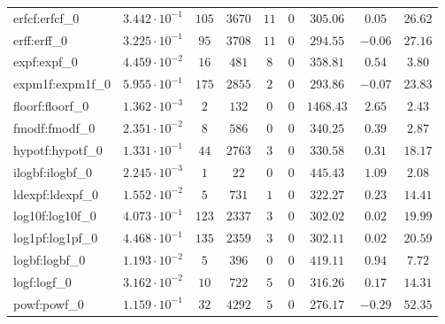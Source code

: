 \begin{tabular}{|l|c|c|c|c|c|c|c|c|}
erfcf:erfcf\_0               & $ 3.442 \cdot 10^{-1} $ & $ 105    $ & $ 3670  $ & $ 11  $ & $ 0   $ & $ 305.06      $ & $ 0.05    $ & $ 26.62   $ \\
erff:erff\_0                 & $ 3.225 \cdot 10^{-1} $ & $ 95     $ & $ 3708  $ & $ 11  $ & $ 0   $ & $ 294.55      $ & $ -0.06   $ & $ 27.16   $ \\
expf:expf\_0                 & $ 4.459 \cdot 10^{-2} $ & $ 16     $ & $ 481   $ & $ 8   $ & $ 0   $ & $ 358.81      $ & $ 0.54    $ & $ 3.80    $ \\
expm1f:expm1f\_0             & $ 5.955 \cdot 10^{-1} $ & $ 175    $ & $ 2855  $ & $ 2   $ & $ 0   $ & $ 293.86      $ & $ -0.07   $ & $ 23.83   $ \\
floorf:floorf\_0             & $ 1.362 \cdot 10^{-3} $ & $ 2      $ & $ 132   $ & $ 0   $ & $ 0   $ & $ 1468.43     $ & $ 2.65    $ & $ 2.43    $ \\
fmodf:fmodf\_0               & $ 2.351 \cdot 10^{-2} $ & $ 8      $ & $ 586   $ & $ 0   $ & $ 0   $ & $ 340.25      $ & $ 0.39    $ & $ 2.87    $ \\
hypotf:hypotf\_0             & $ 1.331 \cdot 10^{-1} $ & $ 44     $ & $ 2763  $ & $ 3   $ & $ 0   $ & $ 330.58      $ & $ 0.31    $ & $ 18.17   $ \\
ilogbf:ilogbf\_0             & $ 2.245 \cdot 10^{-3} $ & $ 1      $ & $ 22    $ & $ 0   $ & $ 0   $ & $ 445.43      $ & $ 1.09    $ & $ 2.08    $ \\
ldexpf:ldexpf\_0             & $ 1.552 \cdot 10^{-2} $ & $ 5      $ & $ 731   $ & $ 1   $ & $ 0   $ & $ 322.27      $ & $ 0.23    $ & $ 14.41   $ \\
log10f:log10f\_0             & $ 4.073 \cdot 10^{-1} $ & $ 123    $ & $ 2337  $ & $ 3   $ & $ 0   $ & $ 302.02      $ & $ 0.02    $ & $ 19.99   $ \\
log1pf:log1pf\_0             & $ 4.468 \cdot 10^{-1} $ & $ 135    $ & $ 2359  $ & $ 3   $ & $ 0   $ & $ 302.11      $ & $ 0.02    $ & $ 20.59   $ \\
logbf:logbf\_0               & $ 1.193 \cdot 10^{-2} $ & $ 5      $ & $ 396   $ & $ 0   $ & $ 0   $ & $ 419.11      $ & $ 0.94    $ & $ 7.72    $ \\
logf:logf\_0                 & $ 3.162 \cdot 10^{-2} $ & $ 10     $ & $ 722   $ & $ 5   $ & $ 0   $ & $ 316.26      $ & $ 0.17    $ & $ 14.31   $ \\
powf:powf\_0                 & $ 1.159 \cdot 10^{-1} $ & $ 32     $ & $ 4292  $ & $ 5   $ & $ 0   $ & $ 276.17      $ & $ -0.29   $ & $ 52.35   $ \\

\end{tabular}
